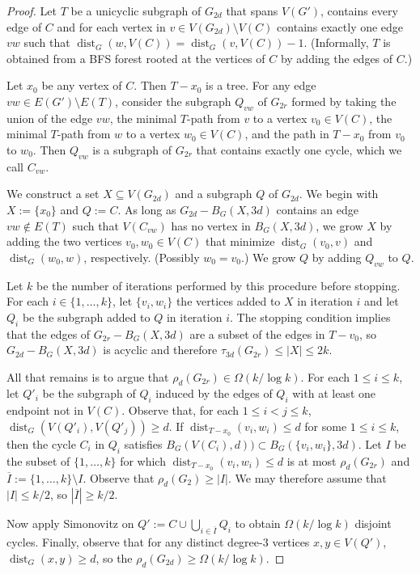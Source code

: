 \documentclass{patmorin}
\renewcommand{\ge}{\geqslant}
\renewcommand{\le}{\leqslant}
\DeclareMathOperator{\dist}{dist}
\begin{document}
\begin{proof}
  Let $T$ be a unicyclic subgraph of $G_{2d}$ that spans $V(G')$, contains every edge of $C$ and for each vertex in $v\in V(G_{2d})\setminus V(C)$ contains exactly one edge $vw$ such that $\dist_G(w,V(C))=\dist_G(v,V(C))-1$.  (Informally, $T$ is obtained from a BFS forest rooted at the vertices of $C$ by adding the edges of $C$.)

  Let $x_0$ be any vertex of $C$.  Then $T-x_0$ is a tree.  For any edge $vw\in E(G')\setminus E(T)$, consider the subgraph $Q_{vw}$ of $G_{2r}$ formed by taking the union of the edge $vw$, the minimal $T$-path from $v$ to a vertex $v_0\in V(C)$, the minimal $T$-path from $w$ to a vertex $w_0\in V(C)$, and the path in $T-x_0$ from $v_0$ to $w_0$.  Then $Q_{vw}$ is a subgraph of $G_{2r}$ that contains exactly one cycle, which we call $C_{vw}$.

  We construct a set $X\subseteq V(G_{2d})$ and a subgraph $Q$ of $G_{2d}$. We begin with $X:=\{x_0\}$ and $Q:=C$.  As long as $G_{2d}-B_G(X,3d)$ contains an edge $vw\not\in E(T)$ such that $V(C_{vw})$ has no vertex in $B_G(X,3d)$, we grow $X$ by adding the two vertices $v_0,w_0\in V(C)$ that minimize $\dist_G(v_0,v)$ and $\dist_G(w_0,w)$, respectively.  (Possibly $w_0=v_0$.)  We grow $Q$ by adding $Q_{vw}$ to $Q$.

  Let $k$ be the number of iterations performed by this procedure before stopping.  For each $i\in\{1,\ldots,k\}$, let $\{v_i,w_i\}$ the vertices added to $X$ in iteration $i$ and let $Q_i$ be the subgraph added to $Q$ in iteration $i$.  The stopping condition implies that the edges of $G_{2r}-B_G(X,3d)$ are a subset of the edges in $T-v_0$, so $G_{2d}-B_G(X,3d)$ is acyclic and therefore $\tau_{3d}(G_{2r})\le |X|\le 2k$.

  All that remains is to argue that $\rho_d(G_{2r})\in\Omega(k/\log k)$.  For each $1\le i\le k$, let $Q'_i$ be the subgraph of $Q_i$ induced by the edges of $Q_i$ with at least one endpoint not in $V(C)$.  Observe that, for each $1\le i<j\le k$, $\dist_G(V(Q'_i),V(Q'_j))\ge d$.  If $\dist_{T-x_0}(v_i,w_i)\le d$ for some $1\le i\le k$, then the cycle $C_i$ in $Q_i$ satisfies $B_G(V(C_i),d))\subset B_G(\{v_i,w_i\},3d)$.   Let $I$ be the subset of $\{1,\ldots,k\}$ for which $\dist_{T-x_0}(v_i,w_i)\le d$ is at most $\rho_d(G_{2r})$ and $\overline{I}:=\{1,\ldots,k\}\setminus I$.  Observe that $\rho_d(G_2)\ge |I|$. We may therefore assume that $|I|\le k/2$, so $|\overline{I}|\ge k/2$.

  Now apply Simonovitz on $Q':=C\cup \bigcup_{i\in\overline{I}} Q_i$ to obtain $\Omega(k/\log k)$ disjoint cycles.  Finally, observe that for any distinct degree-$3$ vertices $x,y\in V(Q')$, $\dist_G(x,y)\ge d$, so the $\rho_d(G_{2d})\ge \Omega(k/\log k)$.
\end{proof}
\end{document}
